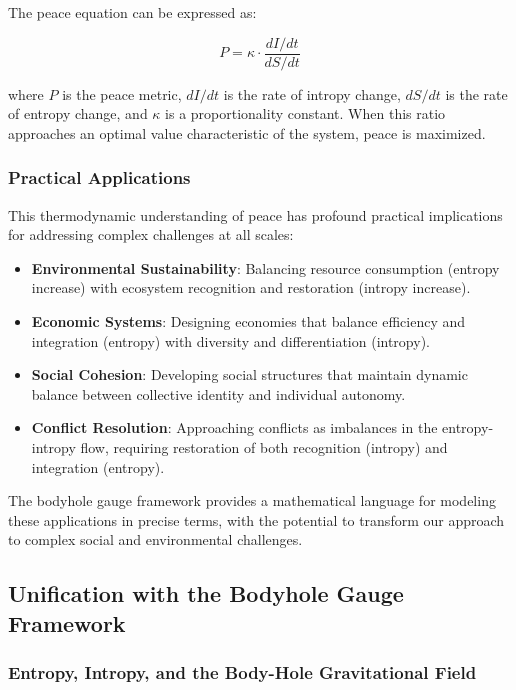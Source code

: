 \documentclass{article}
\begin{document}
The peace equation can be expressed as:

\begin{equation}
P = \kappa \cdot \frac{dI/dt}{dS/dt}
\end{equation}

where $P$ is the peace metric, $dI/dt$ is the rate of intropy change, $dS/dt$ is the rate of entropy change, and $\kappa$ is a proportionality constant. When this ratio approaches an optimal value characteristic of the system, peace is maximized.

\subsubsection{Practical Applications}

This thermodynamic understanding of peace has profound practical implications for addressing complex challenges at all scales:

\begin{itemize}
\item \textbf{Environmental Sustainability}: Balancing resource consumption (entropy increase) with ecosystem recognition and restoration (intropy increase).

\item \textbf{Economic Systems}: Designing economies that balance efficiency and integration (entropy) with diversity and differentiation (intropy).

\item \textbf{Social Cohesion}: Developing social structures that maintain dynamic balance between collective identity and individual autonomy.

\item \textbf{Conflict Resolution}: Approaching conflicts as imbalances in the entropy-intropy flow, requiring restoration of both recognition (intropy) and integration (entropy).
\end{itemize}

The bodyhole gauge framework provides a mathematical language for modeling these applications in precise terms, with the potential to transform our approach to complex social and environmental challenges.

\subsection{Unification with the Bodyhole Gauge Framework}

\subsubsection{Entropy, Intropy, and the Body-Hole Gravitational Field}
\end{document}
